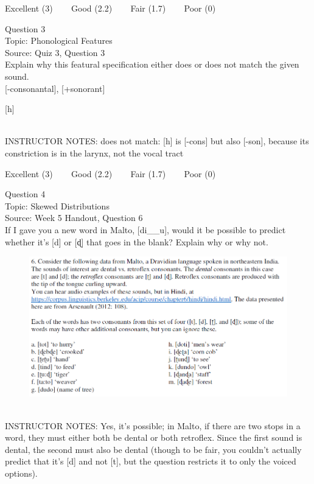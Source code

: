 \documentclass[12pt]{article}
\begin{document}
\vfill
Excellent (3) ~~~ Good (2.2) ~~~ Fair (1.7) ~~~ Poor (0)
\newpage

{\large Question 3}\\

Topic: Phonological Features\\
Source: Quiz 3, Question 3\\

Explain why this featural specification either does or does not match the given sound.\\

{[-consonantal]}, {[+sonorant]}

{[h]}


~\\
INSTRUCTOR NOTES: does not match: [h] is [-cons] but also [-son], because its constriction is in the larynx, not the vocal tract


\vfill
Excellent (3) ~~~ Good (2.2) ~~~ Fair (1.7) ~~~ Poor (0)
\newpage

{\large Question 4}\\

Topic: Skewed Distributions\\
Source: Week 5 Handout, Question 6\\

If I gave you a new word in Malto, [di\_\_u], would it be possible to predict whether it's [d] or [ɖ] that goes in the blank? Explain why or why not.\\

\begin{figure}[H]
\includegraphics{../images/malto.png}
\end{figure}

~\\
INSTRUCTOR NOTES: Yes, it's possible; in Malto, if there are two stops in a word, they must either both be dental or both retroflex. Since the first sound is dental, the second must also be dental (though to be fair, you couldn't actually predict that it's [d] and not [t], but the question restricts it to only the voiced options).
\end{document}
